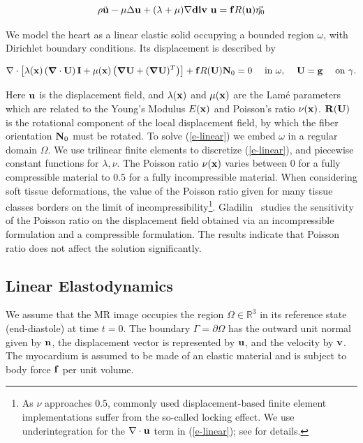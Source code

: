 \[
	\rho \ddot{\bf u} - \mu\Delta{\bf u} + (\lambda+\mu)\nabla {\bf div~} {\bf u} = {\bf f}R({\bf u})\vec{\eta_0}
	\]	

We model the heart as a linear elastic solid occupying a bounded region $\omega$, with Dirichlet boundary conditions. Its displacement is described by 

\begin{equation}
\nabla \cdot \left[\lambda({\bf x})\left({\boldsymbol{\nabla}} \cdot {\bf U} \right) {\bf I} + \mu({\bf x})  \left( {\boldsymbol{\nabla}} {\bf U} + ({\boldsymbol{\nabla}} {\bf U} )^T \right) \right] + {\bf f}R({\bf U})\mathbf{N}_0 = 0  \mbox{~~~~in~} \omega \mbox{,~~~~} {\bf U}  = {\bf g} \mbox{~~~~on~} \gamma.
\label{e-linear}
\end{equation}

Here ${\bf u}$ is the displacement field, and $\lambda({\bf x})$ and $\mu({\bf x})$ are the Lam\'{e} parameters which are related to the Young's Modulus $E({\bf x})$ and Poisson's ratio $\nu({\bf x})$. $\mathbf{R}(\mathbf{U})$ is the rotational component of the local displacement field, by which the fiber orientation $\mathbf{N}_0$ must be rotated. To solve (\ref{e-linear}) we embed $\omega$ in a regular domain $\Omega$. We use trilinear finite elements to discretize (\ref{e-linear}), and piecewise constant functions for $\lambda,\nu$.  The Poisson ratio $\nu({\bf x})$ varies between $0$ for a fully compressible material to $0.5$ for a fully incompressible material. When considering soft tissue deformations, the value of the Poisson ratio given for many tissue classes borders on the limit of incompressibility\footnote{As $\nu$ approaches 0.5, commonly used displacement-based finite element implementations suffer from the so-called locking effect.  We use underintegration for the $\nabla \cdot {\bf u}$ term in (\ref{e-linear}); see \cite{Hughes87} for details.}. Gladilin~\cite{Gladilin2003} studies the sensitivity of the Poisson ratio on the displacement field obtained via an incompressible formulation and a compressible formulation. The results indicate that Poisson ratio does not affect the solution significantly.

\subsection{Linear Elastodynamics}

We assume that the MR image occupies the region $\Omega \in \mathbb{R}^3$ in its reference state (end-diastole) at time $t=0$. The boundary $\Gamma=\partial\Omega$ has the outward unit normal given by $\mathbf{n}$, the displacement vector is represented by $\mathbf{u}$, and the velocity by $\mathbf{v}$. The myocardium is assumed to be made of an elastic material and is subject to body force $\mathbf{f}$ per unit volume.

